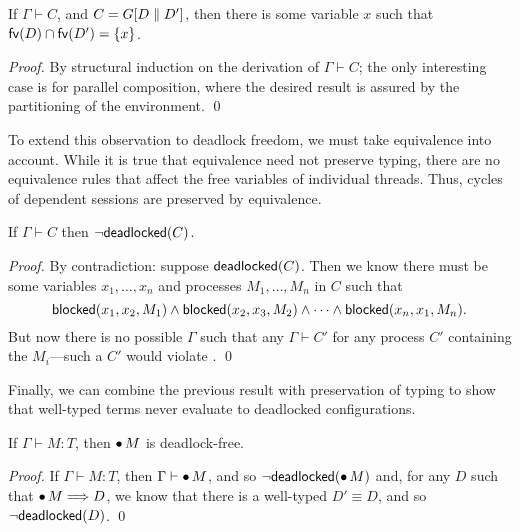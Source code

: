 \documentclass[oribibl,orivec,envcountsame]{llncs}
\begin{document}
\begin{lemma}\label{lem:procs-share-one-channel}
  If $\Gamma \vdash C$, and $C = G[D \parallel D']$, then there is some variable $x$ such that
  $\mathsf{fv}(D) \cap \mathsf{fv}(D') = \{ x \}$.
\end{lemma}

\begin{proof}
  By structural induction on the derivation of $\Gamma \vdash C$; the only interesting case is for
  parallel composition, where the desired result is assured by the partitioning of the
  environment. \qed
\end{proof}

To extend this observation to deadlock freedom, we must take equivalence into account.  While it is
true that equivalence need not preserve typing, there are no equivalence rules that affect the free
variables of individual threads.  Thus, cycles of dependent sessions are preserved by equivalence.

\begin{lemma}\label{lem:typed-configs-df}
  If $\Gamma \vdash C$ then $\lnot \mathsf{deadlocked}(C)$.
\end{lemma}

\begin{proof}
  By contradiction: suppose $\mathsf{deadlocked}(C)$.  Then we know there must be some variables
  $x_1,\dots,x_n$ and processes $M_1,\dots,M_n$ in $C$ such that
  \[
    \mathsf{blocked}(x_1,x_2,M_1) \land \mathsf{blocked}(x_2,x_3,M_2) \land \cdots \land \mathsf{blocked}(x_n,x_1,M_n).
  \]
  But now there is no possible $\Gamma$ such that any $\Gamma \vdash C'$ for any process $C'$
  containing the $M_i$---such a $C'$ would violate .  \qed
\end{proof}

Finally, we can combine the previous result with preservation of typing to show that well-typed
terms never evaluate to deadlocked configurations.

\begin{theorem}\label{thm:typed-terms-df}
  If $\Gamma \vdash M: T$, then ${\mathord{\bullet}}\,M$ is deadlock-free.
\end{theorem}

\begin{proof}
  If $\Gamma \vdash M: T$, then $\Gamma \vdash {\mathord{\bullet}}\,M$, and so
  $\lnot\mathsf{deadlocked}({\mathord{\bullet}}\,M)$ and, for any $D$ such that ${\mathord{\bullet}}\,M \Longrightarrow D$, we
  know that there is a well-typed $D' \equiv D$, and so $\lnot\mathsf{deadlocked}(D)$. \qed
\end{proof}
\end{document}
